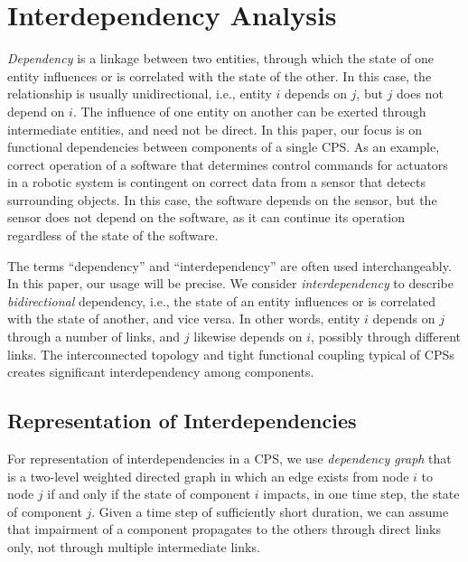 \documentclass[12pt]{elsarticle}
\begin{document}
\section{Interdependency Analysis}
\label{sec:analysis}
\emph{Dependency} is a linkage between two entities, through which the state of one entity influences or is correlated with the state of the other. In this case, the relationship is usually unidirectional, i.e., entity $i$ depends on $j$, but $j$ does not depend on $i$. The influence of one entity on another can be exerted through intermediate entities, and need not be direct. In this paper, our focus is on functional dependencies between components of a single CPS. As an example, correct operation of a software that determines control commands for actuators in a robotic system is contingent on correct data from a sensor that detects surrounding objects. In this case, the software depends on the sensor, but the sensor does not depend on the software, as it can continue its operation regardless of the state of the software.

The terms ``dependency'' and ``interdependency'' are often used interchangeably. In this paper, our usage will be precise. We consider \emph{interdependency} to describe \emph{bidirectional} dependency, i.e., the state of an entity influences or is correlated with the state of another, and vice versa. In other words, entity $i$ depends on $j$ through a number of links, and $j$ likewise depends on $i$, possibly through different links. The interconnected topology and tight functional coupling typical of CPSs creates significant interdependency among components.

\subsection{Representation of Interdependencies}
\label{sec:analysis:repr}
For representation of interdependencies in a CPS, we use \emph{dependency graph} that is a two-level weighted directed graph in which an edge exists from node $i$ to node $j$ if and only if the state of component $i$ impacts, in one time step, the state of component $j$. Given a time step of sufficiently short duration, we can assume that impairment of a component propagates to the others through direct links only, not through multiple intermediate links.
\end{document}
